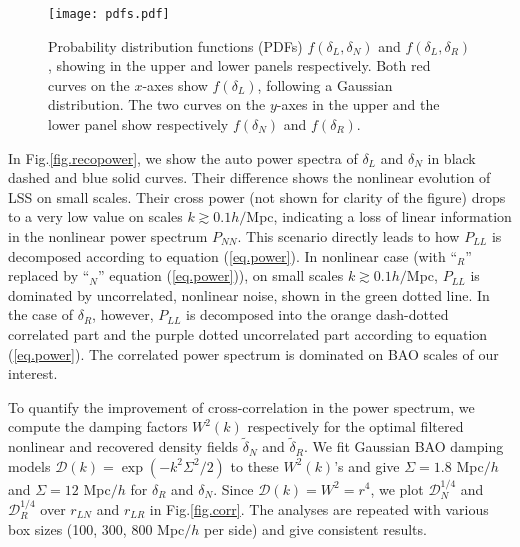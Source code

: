 \documentclass[aps,prd,twocolumn,superscriptaddress,amsfont,amssymb,amsmath,nofootinbib,showpacs,balancelastpage]{revtex4-1}
\begin{document}
\begin{figure}[t] \centering
  \texttt{[image: pdfs.pdf]}
  \caption{Probability distribution functions (PDFs)
  $f(\delta_L,\delta_N)$ and $f(\delta_L,\delta_R)$, showing in the upper
  and lower panels respectively. Both red curves on the $x$-axes show $f(\delta_L)$, following
  a Gaussian distribution. The two curves on the $y$-axes in the upper and the lower panel
  show respectively $f(\delta_N)$ and $f(\delta_R)$.}
  \label{fig.pdfs}
\end{figure}

In Fig.\ref{fig.recopower}, we show the auto power spectra of
$\delta_L$ and $\delta_N$ in black dashed and blue solid curves.
Their difference shows the nonlinear evolution of LSS on
small scales. Their cross power (not shown for clarity of the figure)
drops to a very low value on scales $k\gtrsim 0.1h/$Mpc,
indicating a loss of linear information in the
nonlinear power spectrum $P_{NN}$. This scenario directly
leads to how $P_{LL}$ is decomposed according to equation
(\ref{eq.power}). In nonlinear case (with ``$_R$'' replaced
by ``$_N$'' equation (\ref{eq.power})), on small
scales $k\gtrsim 0.1h/$Mpc, $P_{LL}$ is dominated by
uncorrelated, nonlinear noise, shown in the green
dotted line. In the case of $\delta_R$, however, $P_{LL}$
is decomposed into the orange dash-dotted correlated
part and the purple dotted uncorrelated part according to
equation (\ref{eq.power}). The correlated power spectrum
is dominated on BAO scales of our interest.

To quantify the improvement of cross-correlation in the power
spectrum, we compute the
damping factors $W^2(k)$ respectively for the optimal filtered
nonlinear and recovered density fields $\tilde\delta_N$
and $\tilde\delta_R$.
We fit Gaussian BAO damping models
${\mathcal D}(k)=\exp(-k^2\Sigma^2/2)$ to these $W^2(k)$'s
and give $\Sigma=1.8$ Mpc$/h$ and $\Sigma=12$
Mpc$/h$ for $\delta_R$ and $\delta_N$.
Since ${\mathcal D}(k)=W^2=r^4$, we plot
${\mathcal D}_N^{1/4}$ and ${\mathcal D}_R^{1/4}$
over $r_{LN}$ and $r_{LR}$ in Fig.\ref{fig.corr}.
The analyses are repeated with various box sizes (100, 300, 800 Mpc$/h$ per side)
and give consistent results.
\end{document}
